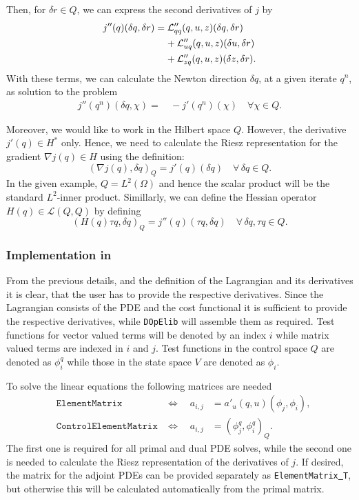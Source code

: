 {Then, for $\delta r\in Q$, we can express the second derivatives of $j$ by
\begin{align*}
j''(q)(\delta q, \delta r) 
&= {\cal L}_{qq}'' (q,u,z)(\delta q,\delta r) \\
&\;\;\;\;+ {\cal L}_{uq}'' (q,u,z)(\delta u,\delta r) \\ 
&\;\;\;\;+ {\cal L}_{zq}'' (q,u,z)(\delta z,\delta r).
\end{align*}
With these terms, we can calculate the Newton direction $\delta q$, at a given 
iterate $q^n$, as solution to the problem
\begin{align*}
j''(q^n )(\delta q,\chi ) =&\, -j'(q^n)(\chi) \quad\forall\chi \in Q.
\end{align*}

Moreover, we would like to work in the Hilbert space $Q$. However, the derivative 
$j'(q) \in H^*$ only. Hence, we need to calculate the Riesz representation 
for the gradient $\nabla j(q) \in H$ using the definition:
\[
 (\nabla j(q),\delta q)_Q = j'(q)(\delta q) \quad \forall\,\delta q\in Q.
\]
In the given example, $Q = L^2(\Omega)$ and hence the scalar product will be the
standard $L^2$-inner product. Simillarly, we can define the Hessian operator 
$H(q) \in \mathcal L(Q,Q)$ by defining
\[
 (H(q)\tau q,\delta q)_Q = j''(q)(\tau q,\delta q) \quad \forall\,\delta q,\tau q\in Q.
\]
}

\subsubsection{Implementation in \dope{}}
From the previous details, and the definition of the Lagrangian and its 
derivatives it is clear, that the user has to provide the respective derivatives. 
Since the Lagrangian consists of the PDE and the cost functional it 
is sufficient to provide the respective derivatives, while \texttt{DOpElib} 
will assemble them as required.
Test functions for vector valued terms will be denoted by an index $i$ while 
matrix valued terms are indexed in $i$ and $j$. Test functions in the control 
space $Q$ are denoted as $\phi^q_i$ while those in the state space $V$ are denoted 
as $\phi_i$.

To solve the linear equations the following matrices are needed
\begin{align*}
&\texttt{ElementMatrix} 
&\Leftrightarrow \quad a_{i,j} &= a'_u(q,u)(\phi_j,\phi_i), \\
&\texttt{ControlElementMatrix}  
&\Leftrightarrow \quad a_{i,j} &= (\phi^q_j, \phi^q_i)_Q.
\end{align*}
The first one is required for all primal and dual PDE solves, while the second one is needed 
to calculate the Riesz representation of the derivatives of $j$. 
If desired, the matrix for the adjoint PDEs can be provided separately as 
\texttt{ElementMatrix\underline{ }T}, but otherwise this will be 
calculated automatically from the primal matrix.

